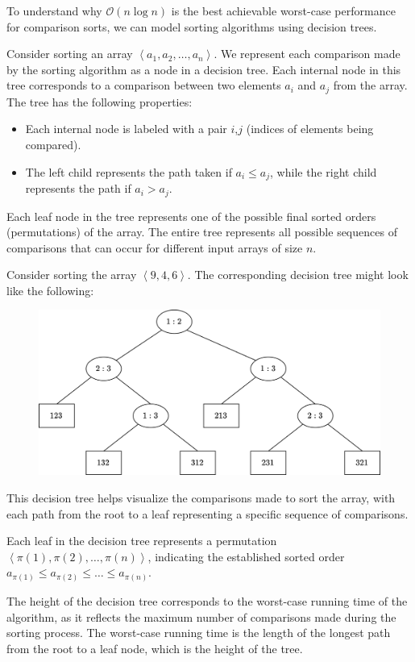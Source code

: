 To understand why $\mathcal{O}(n\log n)$ is the best achievable worst-case performance for comparison sorts, we can model sorting algorithms using decision trees. 

Consider sorting an array $\left\langle a_1,a_2,\dots,a_n\right\rangle$. 
We represent each comparison made by the sorting algorithm as a node in a decision tree.
Each internal node in this tree corresponds to a comparison between two elements $a_i$ and $a_j$ from the array. 
The tree has the following properties:
\begin{itemize}
    \item Each internal node is labeled with a pair $i$,$j$ (indices of elements being compared).
    \item The left child represents the path taken if $a_i \leq a_j$, while the right child represents the path if $a_i > a_j$. 
\end{itemize}
Each leaf node in the tree represents one of the possible final sorted orders (permutations) of the array. 
The entire tree represents all possible sequences of comparisons that can occur for different input arrays of size $n$. 
\begin{example}
    Consider sorting the array $\left\langle 9,4,6\right\rangle$. 
    The corresponding decision tree might look like the following: 
    \begin{figure}[H]
        \centering
        \includegraphics[width=0.8\linewidth]{images/tree1.png}
    \end{figure}
    This decision tree helps visualize the comparisons made to sort the array, with each path from the root to a leaf representing a specific sequence of comparisons.
\end{example}
Each leaf in the decision tree represents a permutation $\left\langle \pi (1), \pi (2),\dots, \pi (n)\right\rangle $, indicating the established sorted order $a_{\pi(1)}\leq a_{\pi(2)} \leq\dots\leq a_{\pi(n)}$.

The height of the decision tree corresponds to the worst-case running time of the algorithm, as it reflects the maximum number of comparisons made during the sorting process.
The worst-case running time is the length of the longest path from the root to a leaf node, which is the height of the tree.

